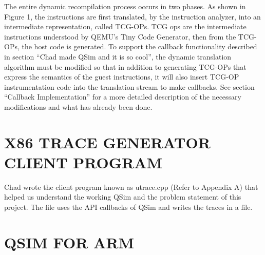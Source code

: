 \documentclass[letterpaper,10pt,twocolumn]{article}
\begin{document}
The entire dynamic recompilation process occurs in two phases. As shown in Figure 1, the instructions are first translated, by the instruction analyzer, into an intermediate representation, called TCG-OPs. TCG ops are the intermediate instructions understood by QEMU's Tiny Code Generator, then from the TCG-OPs, the host code is generated.
To support the callback functionality described in section “Chad made QSim and it is so cool”, the dynamic translation algorithm must be modified so that in addition to generating TCG-OPs that express the semantics of the guest instructions, it will also insert TCG-OP instrumentation code into the translation stream to make callbacks. See section “Callback Implementation” for a more detailed description of the necessary modifications and what has already been done.
\section{X86 TRACE GENERATOR CLIENT PROGRAM}
Chad wrote the client program known as utrace.cpp (Refer to Appendix A) that helped us understand the working QSim and the problem statement of this project. The file uses the API callbacks of QSim and writes the traces in a file.
\section{QSIM FOR ARM}
\end{document}
